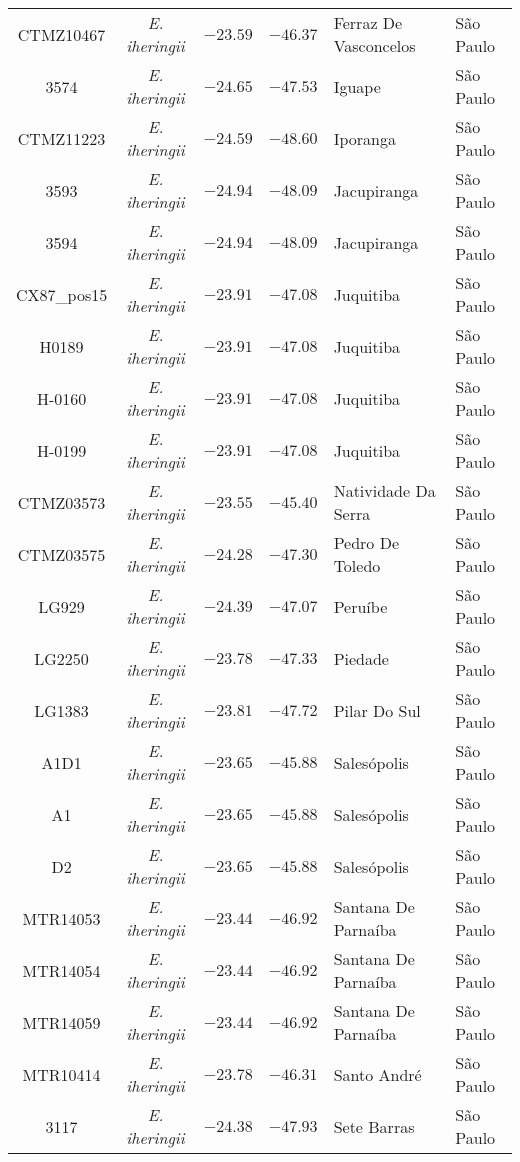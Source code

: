 \begin{longtable}{cc>{\centering\arraybackslash}p{100px}>{\centering\arraybackslash}p{100px}>{\centering\arraybackslash}p{100px}>{\centering\arraybackslash}p{100px}}
CTMZ10467 & \emph{E. iheringii} & $-23.59$ & $-46.37$ & Ferraz De Vasconcelos & São Paulo \\ 
3574 & \emph{E. iheringii} & $-24.65$ & $-47.53$ & Iguape & São Paulo \\ 
CTMZ11223 & \emph{E. iheringii} & $-24.59$ & $-48.60$ & Iporanga & São Paulo \\ 
3593 & \emph{E. iheringii} & $-24.94$ & $-48.09$ & Jacupiranga & São Paulo \\ 
3594 & \emph{E. iheringii} & $-24.94$ & $-48.09$ & Jacupiranga & São Paulo \\ 
CX87\_pos15 & \emph{E. iheringii} & $-23.91$ & $-47.08$ & Juquitiba & São Paulo \\ 
H0189 & \emph{E. iheringii} & $-23.91$ & $-47.08$ & Juquitiba & São Paulo \\ 
H-0160 & \emph{E. iheringii} & $-23.91$ & $-47.08$ & Juquitiba & São Paulo \\ 
H-0199 & \emph{E. iheringii} & $-23.91$ & $-47.08$ & Juquitiba & São Paulo \\ 
CTMZ03573 & \emph{E. iheringii} & $-23.55$ & $-45.40$ & Natividade Da Serra & São Paulo \\ 
CTMZ03575 & \emph{E. iheringii} & $-24.28$ & $-47.30$ & Pedro De Toledo & São Paulo \\ 
LG929 & \emph{E. iheringii} & $-24.39$ & $-47.07$ & Peruíbe & São Paulo \\ 
LG2250 & \emph{E. iheringii} & $-23.78$ & $-47.33$ & Piedade & São Paulo \\ 
LG1383 & \emph{E. iheringii} & $-23.81$ & $-47.72$ & Pilar Do Sul & São Paulo \\ 
A1D1 & \emph{E. iheringii} & $-23.65$ & $-45.88$ & Salesópolis & São Paulo \\ 
A1 & \emph{E. iheringii} & $-23.65$ & $-45.88$ & Salesópolis & São Paulo \\ 
D2 & \emph{E. iheringii} & $-23.65$ & $-45.88$ & Salesópolis & São Paulo \\ 
MTR14053 & \emph{E. iheringii} & $-23.44$ & $-46.92$ & Santana De Parnaíba & São Paulo \\ 
MTR14054 & \emph{E. iheringii} & $-23.44$ & $-46.92$ & Santana De Parnaíba & São Paulo \\ 
MTR14059 & \emph{E. iheringii} & $-23.44$ & $-46.92$ & Santana De Parnaíba & São Paulo \\ 
MTR10414 & \emph{E. iheringii} & $-23.78$ & $-46.31$ & Santo André & São Paulo \\ 
3117 & \emph{E. iheringii} & $-24.38$ & $-47.93$ & Sete Barras & São Paulo \\ 

\end{longtable}
